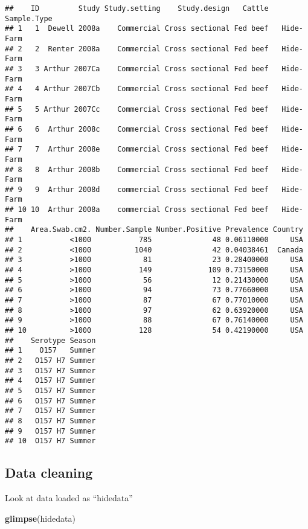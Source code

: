 \documentclass[]{article}
\newenvironment{Shaded}{\begin{snugshade}}{\end{snugshade}}
\newcommand{\KeywordTok}[1]{\textcolor[rgb]{0.13,0.29,0.53}{\textbf{#1}}}
\newcommand{\NormalTok}[1]{#1}
\begin{document}
\begin{verbatim}
##    ID         Study Study.setting    Study.design   Cattle Sample.Type
## 1   1  Dewell 2008a    Commercial Cross sectional Fed beef   Hide-Farm
## 2   2  Renter 2008a    Commercial Cross sectional Fed beef   Hide-Farm
## 3   3 Arthur 2007Ca    Commercial Cross sectional Fed beef   Hide-Farm
## 4   4 Arthur 2007Cb    Commercial Cross sectional Fed beef   Hide-Farm
## 5   5 Arthur 2007Cc    Commercial Cross sectional Fed beef   Hide-Farm
## 6   6  Arthur 2008c    Commercial Cross sectional Fed beef   Hide-Farm
## 7   7  Arthur 2008e    Commercial Cross sectional Fed beef   Hide-Farm
## 8   8  Arthur 2008b    Commercial Cross sectional Fed beef   Hide-Farm
## 9   9  Arthur 2008d    commercial Cross sectional Fed beef   Hide-Farm
## 10 10  Arthur 2008a    commercial Cross sectional Fed beef   Hide-Farm
##    Area.Swab.cm2. Number.Sample Number.Positive Prevalence Country
## 1           <1000           785              48 0.06110000     USA
## 2           <1000          1040              42 0.04038461  Canada
## 3           >1000            81              23 0.28400000     USA
## 4           >1000           149             109 0.73150000     USA
## 5           >1000            56              12 0.21430000     USA
## 6           >1000            94              73 0.77660000     USA
## 7           >1000            87              67 0.77010000     USA
## 8           >1000            97              62 0.63920000     USA
## 9           >1000            88              67 0.76140000     USA
## 10          >1000           128              54 0.42190000     USA
##    Serotype Season
## 1    O157   Summer
## 2   O157 H7 Summer
## 3   O157 H7 Summer
## 4   O157 H7 Summer
## 5   O157 H7 Summer
## 6   O157 H7 Summer
## 7   O157 H7 Summer
## 8   O157 H7 Summer
## 9   O157 H7 Summer
## 10  O157 H7 Summer
\end{verbatim}

\subsection{Data cleaning}\label{data-cleaning}

Look at data loaded as ``hidedata''

\begin{Shaded}
\begin{Highlighting}[]
\KeywordTok{glimpse}\NormalTok{(hidedata)}
\end{Highlighting}
\end{Shaded}
\end{document}
